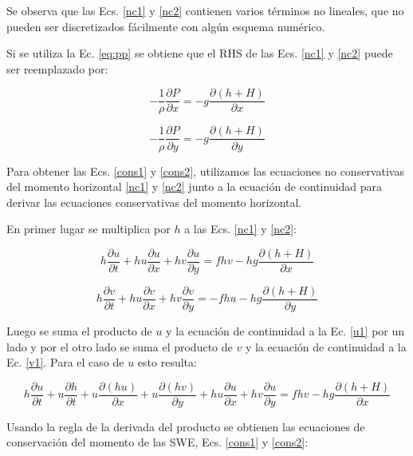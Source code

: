 \documentclass[12pt,dvipsnames]{exam}
\begin{document}
Se observa que las Ecs. \ref{nc1} y \ref{nc2} contienen varios términos no lineales, que no pueden ser discretizados fácilmente con algún esquema numérico.

Si se utiliza la Ec. \ref{eq:pp} se obtiene que el RHS de las Ecs. \ref{nc1} y \ref{nc2} puede ser reemplazado por:

\begin{equation*}
    -\frac{1}{\rho} \frac{\partial P}{\partial x} = - g \frac{\partial (h + H)}{\partial x}
\end{equation*}

\begin{equation*}
        -\frac{1}{\rho} \frac{\partial P}{\partial y} = - g \frac{\partial (h + H)}{\partial y}
\end{equation*}

Para obtener las Ecs. \ref{cons1} y \ref{cons2}, utilizamos las ecuaciones no conservativas del momento horizontal \ref{nc1} y \ref{nc2} junto a la ecuación de continuidad para derivar las ecuaciones conservativas del momento horizontal.

En primer lugar se multiplica por $h$ a las Ecs. \ref{nc1} y \ref{nc2}:

\begin{equation}
    h \frac{\partial u}{\partial t} + h u \frac{\partial u}{\partial x} + h v \frac{\partial u}{\partial y} = f h v - h g \frac{\partial (h + H)}{\partial x}
    \label{u1}
\end{equation}

\begin{equation}
    h \frac{\partial v}{\partial t} + h u \frac{\partial v}{\partial x} + h v \frac{\partial v}{\partial y} = - f h u - h g \frac{\partial (h + H)}{\partial y}
    \label{v1}
\end{equation}


Luego se suma el producto de $u$ y la ecuación de continuidad a la Ec. \ref{u1} por un lado y por el otro lado se suma el producto de $v$ y la ecuación de continuidad a la Ec. \ref{v1}. Para el caso de $u$ esto resulta:

\begin{equation*}
    h \frac{\partial u}{\partial t} + u \frac{\partial h}{\partial t} + u \frac{\partial (h u)}{\partial x} + u \frac{\partial (h v)}{\partial y} + h u \frac{\partial u}{\partial x} + h v \frac{\partial u}{\partial y} = f h v - h g \frac{\partial (h +H)}{\partial x}
\end{equation*}

Usando la regla de la derivada del producto se obtienen las ecuaciones de conservación del momento de las SWE, Ecs. \ref{cons1} y \ref{cons2}:
\end{document}

